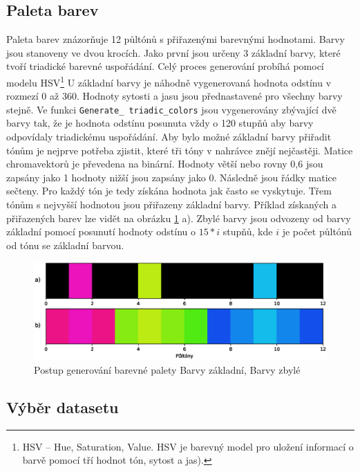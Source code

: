 
\subsection{Paleta barev} \label{sec:Color_palete}

Paleta barev znázorňuje 12 půltónů s přiřazenými barevnými hodnotami. Barvy jsou stanoveny ve dvou krocích. Jako první jsou určeny 3 základní barvy, které tvoří triadické barevné uspořádání. Celý proces generování probíhá pomocí modelu \acs{HSV}\footnote{HSV -- Hue, Saturation, Value. HSV je barevný model pro uložení informací o barvě pomocí tří hodnot tón, sytost a jas).} U základní barvy je náhodně vygenerovaná hodnota odstínu v rozmezí 0 až 360. Hodnoty sytosti a jasu jsou přednastavené pro všechny barvy stejně. Ve funkci \texttt{Generate\_ triadic\_colors} jsou vygenerovány zbývající dvě barvy tak, že je hodnota odstínu posunuta vždy o 120 stupňů aby barvy odpovídaly triadickému uspořádání. Aby bylo možné základní barvy přiřadit tónům je nejprve potřeba zjistit, které tři tóny v nahrávce znějí nejčastěji. Matice chromavektorů je převedena na binární. Hodnoty větší nebo rovny 0,6 jsou zapsány jako 1 hodnoty nižší jsou zapsány jako 0. Následně jsou řádky matice sečteny. Pro každý tón je tedy získána hodnota jak často se vyskytuje. Třem tónům s nejvyšší hodnotou jsou přiřazeny základní barvy. Příklad získaných a přiřazených barev lze vidět na obrázku \ref{fig:Color_palete} a). Zbylé barvy jsou odvozeny od barvy základní pomocí posunutí hodnoty odstínu o $15*i$ stupňů, kde $i$ je počet půltónů od tónu se základní barvou.

\begin{figure}[H]
    \centering
    \includegraphics[width = 1\linewidth]{obrazky/Color_palete.eps}
    \caption{Postup generování barevné palety  Barvy základní,  Barvy zbylé}
    \label{fig:Color_palete}
\end{figure}

\subsection{Výběr datasetu} \label{sec:Vyber_datasetu}

